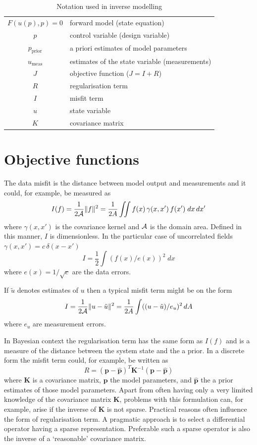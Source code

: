 \documentclass[10pt,a4paper]{book}
\begin{document}
\begin{table}[tb]
\caption{\label{tab:inv} Notation used in inverse modelling}
\begin{center}
\begin{tabular}{cl}
\hline
$F(u(p),p)=0$ & forward model (state equation) \\
$p$ & control variable (design variable) \\
$p_{\mathrm{prior}}$  & a priori estimates of model parameters\\
$u_{\mathrm{meas}}$ & estimates of the state variable (measurements) \\  
$J$ & objective function ($J=I+R$)\\
$R$ & regularisation term\\
$I$ & misfit term\\
$u$ & state variable\\
$K$ & covariance matrix \\
\hline
\end{tabular}
\end{center}
\end{table}


\section{Objective functions}


The data misfit is the distance between model output and measurements and
it could, for example, be measured as
\begin{equation}
I(f) = \frac{1}{2 \cal{A}} \| f \|^2 = \frac{1}{2A} \iint  f(x) \, \gamma(x,x') \, f(x')\; dx \, dx'
\label{eq:O1}
\end{equation}
where $\gamma(x,x')$ is the covariance kernel and $\cal{A}$ is the
domain area. Defined in this manner, $I$ is dimensionless. In the
particular case of uncorrelated fields
$\gamma(x,x')= c \,\delta(x-x')$
\begin{equation}
I =\frac{1}{2} \int  (f(x)/e(x))^2\; dx 
\label{eq:O2}
\end{equation}
where $e(x)=1/\sqrt{c}$ are the data errors. 

If $\tilde{u}$ denotes estimates of $u$ then a typical misfit term might be on the form
\[
I= \frac{1}{2 \cal{A}} \| u-\tilde{u} \|^2 = \frac{1}{2A} \int  ((u-\tilde{u})/e_u)^2 \, dA
\]
where $e_u$ are measurement errors.

In Bayesian context the regularisation term has the same form as
$I(f)$ and is a measure of the distance between the system state and
the a prior. In a discrete form the misfit term could, for example, be
written as
\[
R=(\bm{p}-\hat{\bm{p}})^T \bm{K}^{-1}  (\bm{p}-\hat{\bm{p}}) 
\]
where $\bm{K}$ is a covariance matrix, $\bm{p}$ the model parameters,
and $\hat{\bm{p}}$ the a prior estimates of those model
parameters. Apart from often having only a very limited knowledge of
the covariance matrix $\bm{K}$, problems with this formulation can,
for example, arise if the inverse of $\bm{K}$ is not sparse. Practical
reasons often influence the form of regularisation term. A pragmatic
approach is to select a differential operator having a sparse
representation. Preferable such a sparse operator is also the inverse
of a `reasonable' covariance matrix.
\end{document}
